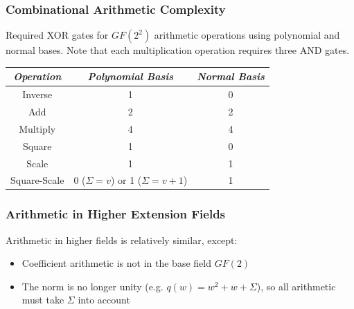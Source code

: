 \documentclass[handout,10pt]{beamer}
\begin{document}
\begin{frame}[fragile]
\begin{figure}[h]
\end{figure}
\end{frame}

\begin{frame}
	\frametitle{Combinational Arithmetic Complexity}
Required XOR gates for $GF(2^2)$ arithmetic operations using polynomial and normal bases. Note that each multiplication operation requires three AND gates.
\begin{table}[ht!]
\begin{center}
	\begin{tabular}{| c | c | c |} \hline
	\emph{Operation} & \emph{Polynomial Basis} & \emph{Normal Basis} \\ \hline
	Inverse      & 1 & 0 \\
	Add          & 2 & 2 \\
	Multiply     & 4 & 4 \\
	Square       & 1 & 0 \\
	Scale        & 1 & 1 \\
	Square-Scale & 0 ($\Sigma = v$) or 1 ($\Sigma = v + 1$) & 1 \\ \hline
	\end{tabular}
\end{center}
\end{table}
\end{frame}

\begin{frame}
	\frametitle{Arithmetic in Higher Extension Fields}
	Arithmetic in higher fields is relatively similar, except:
	\begin{itemize}
		\item Coefficient arithmetic is not in the base field $GF(2)$
		\item The norm is no longer unity (e.g. $q(w) = w^2 + w + \Sigma$), so all arithmetic must take $\Sigma$ into account
	\end{itemize}
\end{frame}
\end{document}
